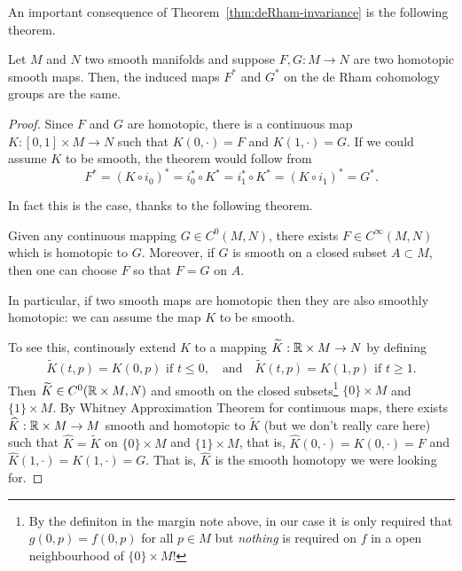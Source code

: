 An important consequence of Theorem~\ref{thm:deRham-invariance} is the following theorem.

\begin{theorem}
	Let $M$ and $N$ two smooth manifolds and suppose $F,G: M\to N$ are two homotopic smooth maps.
	Then, the induced maps $F^*$ and $G^*$ on the de Rham cohomology groups are the same.
\end{theorem}
\begin{proof}
	Since $F$ and $G$ are homotopic, there is a continuous map $K: [0,1]\times M \to N$ such that $K(0,\cdot) = F$ and $K(1,\cdot) = G$.
	If we could assume $K$ to be smooth, the theorem would follow from
	\begin{equation}
		F^* = (K\circ i_0)^* = i_0^*\circ K^* = i_1^*\circ K^* = (K\circ i_1)^* = G^*.
	\end{equation}

	In fact this is the case, thanks to the following theorem.
	\begin{theorem}\label{thm:WhitneyApproxCont}
		Given any continuous mapping $G \in C^0(M,N)$, there exists $F \in C^\infty(M,N)$ which is homotopic to $G$. Moreover, if $G$ is smooth on a closed subset $A\subset M$, then one can choose $F$ so that $F=G$ on $A$.
	\end{theorem}
	In particular, if two smooth maps are homotopic then they are also smoothly homotopic: we can assume the map $K$ to be smooth.

	To see this, continously extend $K$ to a mapping $\widetilde K : \mathbb{R} \times M \to N$ by defining
	\begin{align}
		\widetilde K(t, p) = K(0, p) \mbox{ if } t \leq 0,
		\quad\mbox{and}\quad \widetilde K(t, p) = K(1, p) \mbox{ if } t \geq 1.
	\end{align}
	Then $\widetilde K \in C^0(\mathbb{R}\times M, N)$ and smooth on the closed subsets\footnote{By the definiton in the margin note above, in our case it is only required that $g(0, p) = f(0,p)$ for all $p\in M$ but \emph{nothing} is required on $f$ in a open neighbourhood of $\{0\}\times M$!} $\{0\}\times M$ and $\{1\}\times M$.
	By Whitney Approximation Theorem for continuous maps, there exists $\widehat K : \mathbb{R}\times M \to M$ smooth and homotopic to $\widetilde K$ (but we don't really care here) such that $\widehat K = \widetilde K$ on $\{0\}\times M$ and $\{1\}\times M$, that is, $\widehat K(0, \cdot) = K(0, \cdot) = F$ and $\widehat K(1, \cdot) = K(1, \cdot) = G$.
	That is, $\hat K$ is the smooth homotopy we were looking for.
\end{proof}

